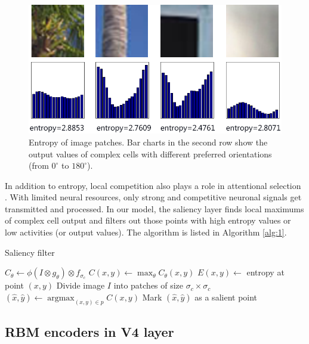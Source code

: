\documentclass[5p]{elsarticle}
\begin{document}
\begin{figure}
\centerline{\includegraphics[width=0.8\linewidth]{images/fig-5.png}} 
\caption{Entropy of image patches.
Bar charts in the second row show the output values of complex cells
with different preferred orientations (from $0^\circ$ to $180^\circ$).}
\label{fig:5}
\end{figure}

In addition to entropy, 
local competition also plays a role in attentional selection \cite{desimone1995}.
With limited neural resources, only strong and competitive neuronal signals get transmitted and processed.
In our model, the saliency layer finds local maximums of complex cell output
and filters out those points with high entropy values or low activities (or output values).
The algorithm is listed in Algorithm \ref{alg:1}.

\begin{algorithm}
  \caption{Saliency filter}
  \label{alg:1}
  \begin{algorithmic}[1]
        \State $C_{\theta}\leftarrow\phi(I\otimes g_{\theta})\otimes f_{\sigma_c}$
      \EndFor
        \State $C(x,y)\leftarrow\max_{\theta}C_{\theta}(x,y)$
        \State $E(x,y)\leftarrow$ entropy at point $(x,y)$
      \EndFor
      \State Divide image $I$ into patches of size $\sigma_c\times\sigma_c$
        \State $(\hat{x},\hat{y})\leftarrow\operatorname{argmax}_{(x,y)\in p}C(x,y)$
          \State Mark $(\hat{x},\hat{y})$ as a salient point
        \EndIf
      \EndFor
    \EndProcedure
  \end{algorithmic}
\end{algorithm}

\subsection{RBM encoders in V4 layer}
\end{document}

